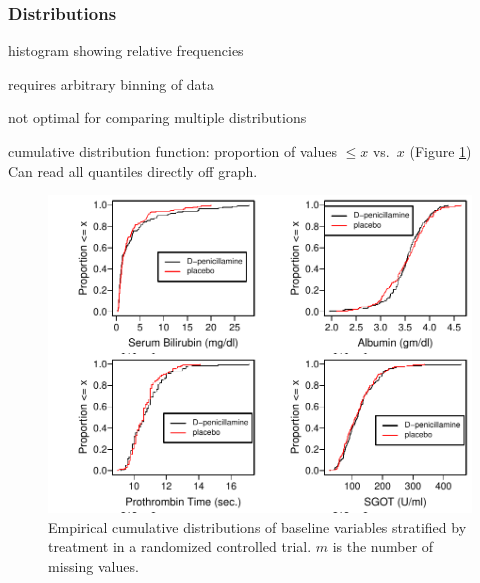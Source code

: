 \subsubsection{Distributions}\label{sec:desc-dist}
\bi
\item histogram showing relative frequencies
 \bi
 \item requires arbitrary binning of data
 \item not optimal for comparing multiple distributions
 \ei
\item cumulative distribution function: proportion of values $\leq x$
  vs.\ $x$ (Figure \ref{fig:descript-ecdf}) \\
 Can read all quantiles directly off graph.
\begin{Schunk}
\begin{figure}[htbp]

\centerline{\includegraphics[width=\maxwidth]{descript-ecdf-1} }

\caption[Empirical cumulative distribution functions]{Empirical cumulative distributions of baseline variables  stratified by treatment in a randomized controlled trial. $m$ is the number of missing values.}\label{fig:descript-ecdf}
\end{figure}
\end{Schunk}

